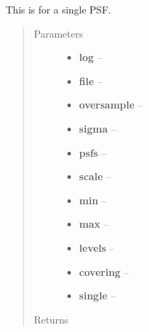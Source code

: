 \documentclass[a4paper,11pt,english]{sphinxmanual}
\begin{document}
\begin{fulllineitems}
\label{reduction:analysis.cosmicrayCalibration.testCosmicrayRejection}
This is for a single PSF.
\begin{quote}\begin{description}
\item[{Parameters}] \leavevmode\begin{itemize}
\item {} 
\textbf{log} -- 

\item {} 
\textbf{file} -- 

\item {} 
\textbf{oversample} -- 

\item {} 
\textbf{sigma} -- 

\item {} 
\textbf{psfs} -- 

\item {} 
\textbf{scale} -- 

\item {} 
\textbf{min} -- 

\item {} 
\textbf{max} -- 

\item {} 
\textbf{levels} -- 

\item {} 
\textbf{covering} -- 

\item {} 
\textbf{single} -- 

\end{itemize}

\item[{Returns}] \leavevmode


\end{description}\end{quote}

\end{fulllineitems}

\end{document}
